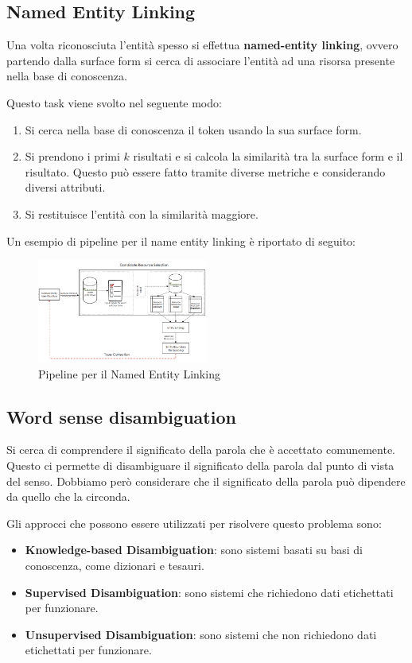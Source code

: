 \subsection{Named Entity Linking}
Una volta riconosciuta l'entità spesso si effettua \textbf{named-entity linking},
ovvero partendo dalla surface form si cerca di associare l'entità ad una risorsa
presente nella base di conoscenza.

Questo task viene svolto nel seguente modo:
\begin{enumerate}
      \item Si cerca nella base di conoscenza il token usando la sua surface form.
      \item Si prendono i primi $k$ risultati e si calcola la similarità tra
            la surface form e il risultato. Questo può essere fatto tramite
            diverse metriche e considerando diversi attributi.
      \item Si restituisce l'entità con la similarità maggiore.
\end{enumerate}

Un esempio di pipeline per il name entity linking è riportato di seguito:
\begin{figure}[!ht]
      \centering
      \includegraphics[width=0.5\textwidth]{./img/nlp/nel.png}
      \caption{Pipeline per il Named Entity Linking}
      \label{fig:nel}
\end{figure}
\subsection{Word sense disambiguation}
Si cerca di comprendere il significato della parola che è accettato comunemente.
Questo ci permette di disambiguare il significato della parola dal punto di
vista del senso. Dobbiamo però considerare che il significato della parola può
dipendere da quello che la circonda.

Gli approcci che possono essere utilizzati per risolvere questo problema sono:
\begin{itemize}
      \item \textbf{Knowledge-based Disambiguation}: sono sistemi basati su basi
            di conoscenza, come dizionari e tesauri.
      \item \textbf{Supervised Disambiguation}: sono sistemi che richiedono dati
            etichettati per funzionare.
      \item \textbf{Unsupervised Disambiguation}: sono sistemi che non richiedono
            dati etichettati per funzionare.
\end{itemize}
